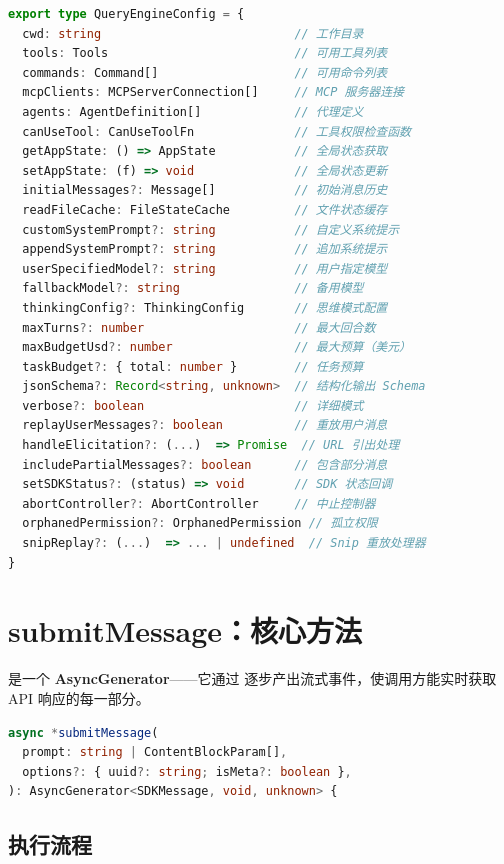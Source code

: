 \begin{lstlisting}[language=TypeScript,breaklines=true]
export type QueryEngineConfig = {
  cwd: string                           // 工作目录
  tools: Tools                          // 可用工具列表
  commands: Command[]                   // 可用命令列表
  mcpClients: MCPServerConnection[]     // MCP 服务器连接
  agents: AgentDefinition[]             // 代理定义
  canUseTool: CanUseToolFn              // 工具权限检查函数
  getAppState: () => AppState           // 全局状态获取
  setAppState: (f) => void              // 全局状态更新
  initialMessages?: Message[]           // 初始消息历史
  readFileCache: FileStateCache         // 文件状态缓存
  customSystemPrompt?: string           // 自定义系统提示
  appendSystemPrompt?: string           // 追加系统提示
  userSpecifiedModel?: string           // 用户指定模型
  fallbackModel?: string                // 备用模型
  thinkingConfig?: ThinkingConfig       // 思维模式配置
  maxTurns?: number                     // 最大回合数
  maxBudgetUsd?: number                 // 最大预算（美元）
  taskBudget?: { total: number }        // 任务预算
  jsonSchema?: Record<string, unknown>  // 结构化输出 Schema
  verbose?: boolean                     // 详细模式
  replayUserMessages?: boolean          // 重放用户消息
  handleElicitation?: (...)  => Promise  // URL 引出处理
  includePartialMessages?: boolean      // 包含部分消息
  setSDKStatus?: (status) => void       // SDK 状态回调
  abortController?: AbortController     // 中止控制器
  orphanedPermission?: OrphanedPermission // 孤立权限
  snipReplay?: (...)  => ... | undefined  // Snip 重放处理器
}
\end{lstlisting}

\section{submitMessage：核心方法}

 是一个 \textbf{AsyncGenerator}——它通过  逐步产出流式事件，使调用方能实时获取 API 响应的每一部分。

\begin{lstlisting}[language=TypeScript,breaklines=true]
async *submitMessage(
  prompt: string | ContentBlockParam[],
  options?: { uuid?: string; isMeta?: boolean },
): AsyncGenerator<SDKMessage, void, unknown> {
\end{lstlisting}

\subsection{执行流程}

